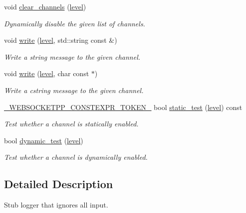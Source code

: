 \begin{DoxyCompactItemize}
void \hyperlink{classwebsocketpp_1_1log_1_1stub_af4bea37fd436439b0ab19238b2c47d15}{clear\+\_\+channels} (\hyperlink{namespacewebsocketpp_1_1log_a12d4d17939f102db8c9183d400a41960}{level})
\begin{DoxyCompactList}\small\item\em Dynamically disable the given list of channels. \end{DoxyCompactList}\item 
void \hyperlink{classwebsocketpp_1_1log_1_1stub_ae14dd42a83305f2dd9c03fc5018c88ee}{write} (\hyperlink{namespacewebsocketpp_1_1log_a12d4d17939f102db8c9183d400a41960}{level}, std\+::string const \&)
\begin{DoxyCompactList}\small\item\em Write a string message to the given channel. \end{DoxyCompactList}\item 
void \hyperlink{classwebsocketpp_1_1log_1_1stub_a6c6844e088cfc64d9945348a52a86c73}{write} (\hyperlink{namespacewebsocketpp_1_1log_a12d4d17939f102db8c9183d400a41960}{level}, char const $\ast$)
\begin{DoxyCompactList}\small\item\em Write a cstring message to the given channel. \end{DoxyCompactList}\item 
\hyperlink{boost__config_8hpp_a3dc3ece336a6149d2fe208a9daf66043}{\+\_\+\+W\+E\+B\+S\+O\+C\+K\+E\+T\+P\+P\+\_\+\+C\+O\+N\+S\+T\+E\+X\+P\+R\+\_\+\+T\+O\+K\+E\+N\+\_\+} bool \hyperlink{classwebsocketpp_1_1log_1_1stub_a7ad06bcf591db4d8e72b015470c51a98}{static\+\_\+test} (\hyperlink{namespacewebsocketpp_1_1log_a12d4d17939f102db8c9183d400a41960}{level}) const 
\begin{DoxyCompactList}\small\item\em Test whether a channel is statically enabled. \end{DoxyCompactList}\item 
bool \hyperlink{classwebsocketpp_1_1log_1_1stub_ada729613ea1f62a71f47a4736978b096}{dynamic\+\_\+test} (\hyperlink{namespacewebsocketpp_1_1log_a12d4d17939f102db8c9183d400a41960}{level})
\begin{DoxyCompactList}\small\item\em Test whether a channel is dynamically enabled. \end{DoxyCompactList}\end{DoxyCompactItemize}


\subsection{Detailed Description}
Stub logger that ignores all input. 


